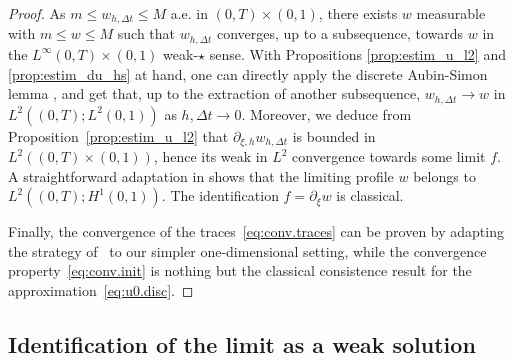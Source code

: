 \documentclass{amsart}
\newcommand\dt{\Delta t}
\begin{document}
	\begin{proof}
	As $m \leq w_{h,\dt} \leq M$ a.e. in $(0,T) \times (0,1)$, there exists $w$ measurable with $m \leq w \leq M$ such that $w_{h,\dt}$ converges, up to a subsequence, 
	towards $w$ in the $L^\infty(0,T) \times (0,1)$ weak-$\star$ sense. 	
		With Propositions \ref{prop:estim_u_l2} and \ref{prop:estim_du_hs} at hand, one can directly apply the discrete Aubin-Simon lemma \cite[Theorem 3.4]{GallLatch}, and get that, up to the extraction of another subsequence, $ w_{h,\dt} \longrightarrow w$ in $L^2((0,T) ; L^2(0,1))$ as $h,\dt \rightarrow 0$. 
		Moreover, we deduce from Proposition~\ref{prop:estim_u_l2} that $\partial_{\xi,h} w_{h,\dt}$ is bounded in $L^2((0,T)\times(0,1))$, hence its weak in $L^2$ convergence towards some limit $f$.
		A straightforward adaptation in \cite[Lemma 8.2]{EGH00} shows that the limiting profile $w$ belongs to $L^2((0,T);H^1(0,1))$. The identification $f = \partial_\xi w$ is classical. 
		
	Finally, the convergence of the traces~\eqref{eq:conv.traces} can be proven by adapting the strategy of~\cite[Section 4.2]{BrenCancHilh} to our simpler one-dimensional setting, while the convergence property~\eqref{eq:conv.init} is nothing but the classical consistence result for the approximation~\eqref{eq:u0.disc}. 
	\end{proof}
	

\subsection{Identification of the limit as a weak solution}
\end{document}
